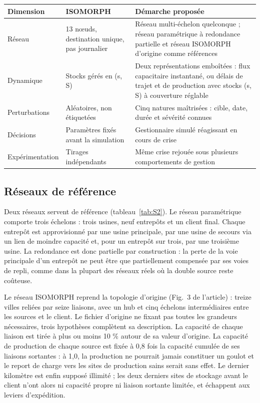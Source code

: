 \begin{center}\begin{minipage}{\textwidth}
\label{tab:S1}
\footnotesize
\begin{tabularx}{\textwidth}{@{}LLL@{}}
\toprule
\textbf{Dimension} & \textbf{ISOMORPH} & \textbf{Démarche proposée} \\
\midrule
Réseau & 13 nœuds, destination unique, pas journalier & Réseau multi-échelon quelconque ; réseau paramétrique à redondance partielle et réseau ISOMORPH d'origine comme références \\
Dynamique & Stocks gérés en (s, S) & Deux représentations emboîtées : flux capacitaire instantané, ou délais de trajet et de production avec stocks (s, S) à couverture réglable \\
Perturbations & Aléatoires, non étiquetées & Cinq natures maîtrisées : cible, date, durée et sévérité connues \\
Décisions & Paramètres fixés avant la simulation & Gestionnaire simulé réagissant en cours de crise \\
Expérimentation & Tirages indépendants & Même crise rejouée sous plusieurs comportements de gestion \\
\bottomrule
\end{tabularx}
\end{minipage}\end{center}

\subsection*{Réseaux de référence}

Deux réseaux servent de référence (tableau~\ref{tab:S2}). Le réseau paramétrique comporte trois échelons : trois usines, neuf entrepôts et un client final. Chaque entrepôt est approvisionné par une usine principale, par une usine de secours via un lien de moindre capacité et, pour un entrepôt sur trois, par une troisième usine. La redondance est donc partielle par construction : la perte de la voie principale d'un entrepôt ne peut être que partiellement compensée par ses voies de repli, comme dans la plupart des réseaux réels où la double source reste coûteuse.

Le réseau ISOMORPH reprend la topologie d'origine (Fig.~3 de l'article) : treize villes reliées par seize liaisons, avec un hub et cinq échelons intermédiaires entre les sources et le client. Le fichier d'origine ne fixant pas toutes les grandeurs nécessaires, trois hypothèses complètent sa description. La capacité de chaque liaison est tirée à plus ou moins 10 \% autour de sa valeur d'origine. La capacité de production de chaque source est fixée à 0,8 fois la capacité cumulée de ses liaisons sortantes : à 1,0, la production ne pourrait jamais constituer un goulot et le report de charge vers les sites de production sains serait sans effet. Le dernier kilomètre est enfin supposé illimité ; les deux derniers sites de stockage avant le client n'ont alors ni capacité propre ni liaison sortante limitée, et échappent aux leviers d'expédition.

